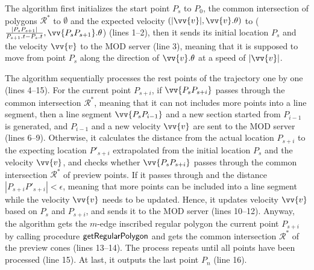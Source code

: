 The algorithm first initializes the start point $P_s$ to $P_0$, the common intersection of polygons $\mathcal{R}^*$ to $\emptyset$ and the expected velocity $(|\vv{v}|, \vv{v}.\theta)$ to ($\frac{|P_{s}P_{s+1}|}{P_{s+1}.t-P_s.t},\vv{P_{s}P_{s+1}}.\theta$) (lines 1--2), then it sends its initial location $P_s$ and the velocity $\vv{v}$ to the MOD server (line 3), meaning that it is supposed to move from point $P_s$ along the direction of $\vv{v}.\theta$ at a speed of $|\vv{v}|$.

The algorithm sequentially processes the rest points of the trajectory one by one (lines 4--15). 
For the current point $P_{s+i}$, if $\vv{P_sP_{s+i}}$ passes through the common intersection $\mathcal{R}^*$, meaning that it can not includes more points into a line segment, then a line segment $\vv{P_sP_{i-1}}$ and a new section started from  $P_{i-1}$ is generated, and $P_{i-1}$ and a new velocity $\vv{v}$ are sent to the MOD server (lines 6--9).
%
Otherwise, it calculates the distance from the actual location $P_{s+i}$ to the expecting location $P'_{s+i}$ extrapolated from the initial location $P_s$ and the velocity $\vv{v}$, and checks whether $\vv{P_sP_{s+i}}$ passes through the common intersection $\mathcal{R}^*$ of preview points.
If it passes through and the distance $|P_{s+i}P'_{s+i}|<\epsilon$, meaning that more points can be included into a line segment while the velocity $\vv{v}$ needs to be updated. Hence, it updates velocity $\vv{v}$ based on $P_s$ and $P_{s+i}$, and sends it to the MOD server (lines 10--12). 
%
Anyway, the algorithm gets the $m$-edge inscribed regular polygon \wrt the current point $P_{s+i}$ by calling procedure ${\mathsf{getRegularPolygon}}$ \cite{Lin:Cised} and gets the common intersection $\mathcal{R}^*$ of the preview cones (lines 13--14). The process repeats until all points have been processed (line 15).
At last, it outputs the last point $P_{n}$ (line 16).




